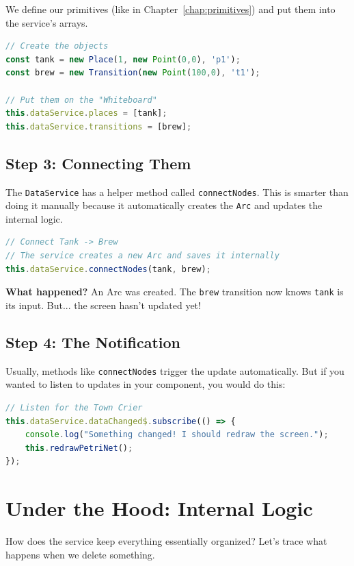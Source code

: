 \documentclass[a4paper,11pt,oneside]{report}
\begin{document}
We define our primitives (like in Chapter~\ref{chap:primitives}) and put them into the service's arrays.

\begin{lstlisting}[language=TypeScript]
// Create the objects
const tank = new Place(1, new Point(0,0), 'p1');
const brew = new Transition(new Point(100,0), 't1');

// Put them on the "Whiteboard"
this.dataService.places = [tank];
this.dataService.transitions = [brew];
\end{lstlisting}

\subsection{Step 3: Connecting Them}

The \texttt{DataService} has a helper method called \texttt{connectNodes}. This is smarter than doing it manually because it automatically creates the \texttt{Arc} and updates the internal logic.

\begin{lstlisting}[language=TypeScript]
// Connect Tank -> Brew
// The service creates a new Arc and saves it internally
this.dataService.connectNodes(tank, brew);
\end{lstlisting}

\textbf{What happened?} An Arc was created. The \texttt{brew} transition now knows \texttt{tank} is its input. But... the screen hasn't updated yet!

\subsection{Step 4: The Notification}

Usually, methods like \texttt{connectNodes} trigger the update automatically. But if you wanted to listen to updates in your component, you would do this:

\begin{lstlisting}[language=TypeScript]
// Listen for the Town Crier
this.dataService.dataChanged$.subscribe(() => {
    console.log("Something changed! I should redraw the screen.");
    this.redrawPetriNet();
});
\end{lstlisting}

\section{Under the Hood: Internal Logic}

How does the service keep everything essentially organized? Let's trace what happens when we delete something.
\end{document}
